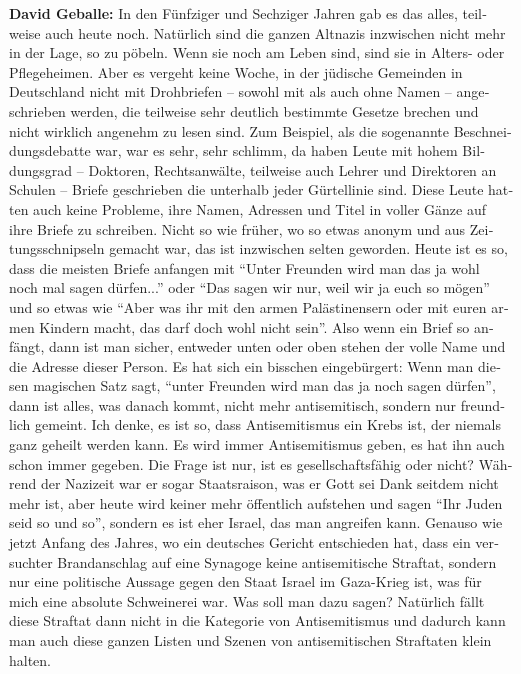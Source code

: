 \begin{otherlanguage}{ngerman}
\textbf{David Geballe:} In den Fünfziger und Sechziger Jahren gab es das alles, teilweise auch heute noch. Natürlich sind die ganzen Altnazis inzwischen nicht mehr in der Lage, so zu pöbeln. Wenn sie noch am Leben sind, sind sie in Alters- oder Pflegeheimen. Aber es vergeht keine Woche, in der jüdische Gemeinden in Deutschland nicht mit Drohbriefen – sowohl mit als auch ohne Namen – angeschrieben werden, die teilweise sehr deutlich bestimmte Gesetze brechen und nicht wirklich angenehm zu lesen sind. Zum Beispiel, als die sogenannte Beschneidungsdebatte war, war es sehr, sehr schlimm, da haben Leute mit hohem Bildungsgrad – Doktoren, Rechtsanwälte, teilweise auch Lehrer und Direktoren an Schulen – Briefe geschrieben die unterhalb jeder Gürtellinie sind. Diese Leute hatten auch keine Probleme, ihre Namen, Adressen und Titel in voller Gänze auf ihre Briefe zu schreiben. Nicht so wie früher, wo so etwas anonym und aus Zeitungsschnipseln gemacht war, das ist inzwischen selten geworden. Heute ist es so, dass die meisten Briefe anfangen mit "`Unter Freunden wird man das ja wohl noch mal sagen dürfen..."' oder "`Das sagen wir nur, weil wir ja euch so mögen"' und so etwas wie "`Aber was ihr mit den armen Palästinensern oder mit euren armen Kindern macht, das darf doch wohl nicht sein"'. Also wenn ein Brief so anfängt, dann ist man sicher, entweder unten oder oben stehen der volle Name und die Adresse dieser Person. Es hat sich ein bisschen eingebürgert: Wenn man diesen magischen Satz sagt, "`unter Freunden wird man das ja noch sagen dürfen"', dann ist alles, was danach kommt, nicht mehr antisemitisch, sondern nur freundlich gemeint. 
Ich denke, es ist so, dass Antisemitismus ein Krebs ist, der niemals ganz geheilt werden kann. Es wird immer Antisemitismus geben, es hat ihn auch schon immer gegeben. Die Frage ist nur, ist es gesellschaftsfähig oder nicht? Während der Nazizeit war er sogar Staatsraison, was er Gott sei Dank seitdem nicht mehr ist, aber heute wird keiner mehr öffentlich aufstehen und sagen "`Ihr Juden seid so und so"', sondern es ist eher Israel, das man angreifen kann. Genauso wie jetzt Anfang des Jahres, wo ein deutsches Gericht entschieden hat, dass ein versuchter Brandanschlag auf eine Synagoge keine antisemitische Straftat, sondern nur eine politische Aussage gegen den Staat Israel im Gaza-Krieg ist, was für mich eine absolute Schweinerei war. Was soll man dazu sagen? Natürlich fällt diese Straftat dann nicht in die Kategorie von Antisemitismus und dadurch kann man auch diese ganzen Listen und Szenen von antisemitischen Straftaten klein halten. 


\end{otherlanguage}
